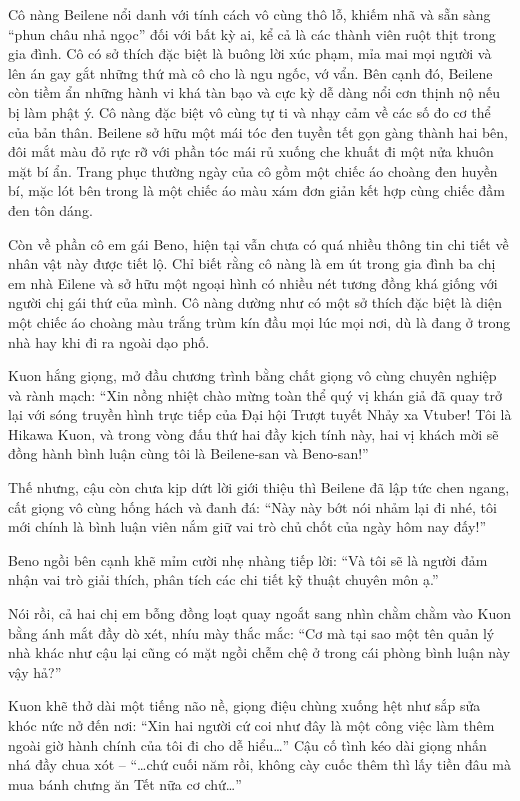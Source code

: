 \documentclass[../main.tex]{subfiles}
\begin{document}
Cô nàng Beilene nổi danh với tính cách vô cùng thô lỗ, khiếm nhã và sẵn sàng ``phun châu nhả ngọc'' đối với bất kỳ ai, kể cả là các thành viên ruột thịt trong gia đình. Cô có sở thích đặc biệt là buông lời xúc phạm, mỉa mai mọi người và lên án gay gắt những thứ mà cô cho là ngu ngốc, vớ vẩn. Bên cạnh đó, Beilene còn tiềm ẩn những hành vi khá tàn bạo và cực kỳ dễ dàng nổi cơn thịnh nộ nếu bị làm phật ý. Cô nàng đặc biệt vô cùng tự ti và nhạy cảm về các số đo cơ thể của bản thân. Beilene sở hữu một mái tóc đen tuyền tết gọn gàng thành hai bên, đôi mắt màu đỏ rực rỡ với phần tóc mái rủ xuống che khuất đi một nửa khuôn mặt bí ẩn. Trang phục thường ngày của cô gồm một chiếc áo choàng đen huyền bí, mặc lót bên trong là một chiếc áo màu xám đơn giản kết hợp cùng chiếc đầm đen tôn dáng.

Còn về phần cô em gái Beno, hiện tại vẫn chưa có quá nhiều thông tin chi tiết về nhân vật này được tiết lộ. Chỉ biết rằng cô nàng là em út trong gia đình ba chị em nhà Eilene và sở hữu một ngoại hình có nhiều nét tương đồng khá giống với người chị gái thứ của mình. Cô nàng dường như có một sở thích đặc biệt là diện một chiếc áo choàng màu trắng trùm kín đầu mọi lúc mọi nơi, dù là đang ở trong nhà hay khi đi ra ngoài dạo phố.


\chrint

Kuon hắng giọng, mở đầu chương trình bằng chất giọng vô cùng chuyên nghiệp và rành mạch: ``Xin nồng nhiệt chào mừng toàn thể quý vị khán giả đã quay trở lại với sóng truyền hình trực tiếp của Đại hội Trượt tuyết Nhảy xa Vtuber! Tôi là Hikawa Kuon, và trong vòng đấu thứ hai đầy kịch tính này, hai vị khách mời sẽ đồng hành bình luận cùng tôi là Beilene-san và Beno-san!''

Thế nhưng, cậu còn chưa kịp dứt lời giới thiệu thì Beilene đã lập tức chen ngang, cất giọng vô cùng hống hách và đanh đá: ``Này này bớt nói nhảm lại đi nhé, tôi mới chính là bình luận viên nắm giữ vai trò chủ chốt của ngày hôm nay đấy!''

Beno ngồi bên cạnh khẽ mỉm cười nhẹ nhàng tiếp lời: ``Và tôi sẽ là người đảm nhận vai trò giải thích, phân tích các chi tiết kỹ thuật chuyên môn ạ.''

Nói rồi, cả hai chị em bỗng đồng loạt quay ngoắt sang nhìn chằm chằm vào Kuon bằng ánh mắt đầy dò xét, nhíu mày thắc mắc: ``Cơ mà tại sao một tên quản lý nhà khác như cậu lại cũng có mặt ngồi chễm chệ ở trong cái phòng bình luận này vậy hả?''

Kuon khẽ thở dài một tiếng não nề, giọng điệu chùng xuống hệt như sắp sửa khóc nức nở đến nơi: ``Xin hai người cứ coi như đây là một công việc làm thêm ngoài giờ hành chính của tôi đi cho dễ hiểu\dots'' Cậu cố tình kéo dài giọng nhấn nhá đầy chua xót – ``\dots chứ cuối năm rồi, không cày cuốc thêm thì lấy tiền đâu mà mua bánh chưng ăn Tết nữa cơ chứ\dots''
\end{document}

